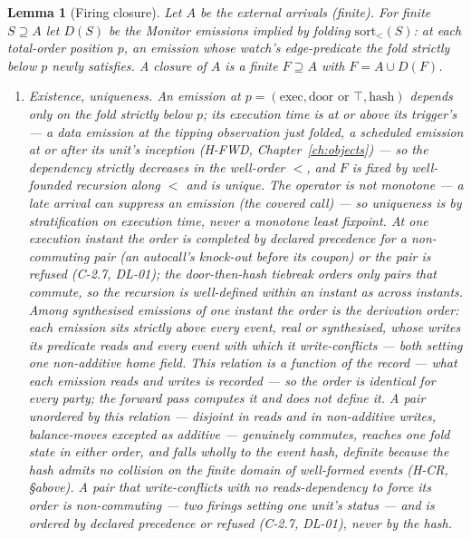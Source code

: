 \documentclass[11pt,a4paper]{article}
\newtheorem{lemma}[definition]{Lemma}
\begin{document}
\begin{lemma}[Firing closure]\label{lem:closure}
Let $A$ be the external arrivals (finite). For finite $S\supseteq A$ let $D(S)$ be the Monitor
emissions implied by folding $\mathrm{sort}_<(S)$: at each total-order position $p$, an emission
whose watch's edge-predicate the fold strictly below $p$ newly satisfies. A \emph{closure} of
$A$ is a finite $F\supseteq A$ with $F=A\cup D(F)$.
\begin{enumerate}
\item \emph{Existence, uniqueness.} An emission at $p=(\mathrm{exec},\mathrm{door}\text{ or }\top,
  \mathrm{hash})$ depends only on the fold strictly below $p$; its execution time is at or above
  its trigger's --- a data emission at the tipping observation just folded, a scheduled emission
  at or after its unit's inception \textup{(H-FWD, Chapter~\ref{ch:objects})} --- so the
  dependency strictly decreases in the well-order $<$, and $F$ is fixed by well-founded recursion
  along $<$ and is unique. The operator is \emph{not} monotone --- a late arrival can suppress an
  emission (the covered call) --- so uniqueness is by stratification on execution time, never a
  monotone least fixpoint. At one execution instant the order is completed by declared precedence
  for a non-commuting pair (an autocall's knock-out before its coupon) or the pair is refused
  (C-2.7, DL-01); the door-then-hash tiebreak orders only pairs that commute, so the recursion is
  well-defined within an instant as across instants. Among synthesised emissions of one instant the
  order is the \emph{derivation order}: each emission sits strictly above every event, real or
  synthesised, whose writes its predicate reads \emph{and} every event with which it write-conflicts
  --- both setting one non-additive home field. This relation is a function of the record --- what
  each emission reads and writes is recorded --- so the order is identical for every party; the
  forward pass \emph{computes} it and does not define it. A pair unordered by this relation ---
  disjoint in reads and in non-additive writes, balance-moves excepted as additive --- genuinely
  \emph{commutes}, reaches one fold state in either order, and falls wholly to the event hash,
  definite because the hash admits no collision on the finite domain of well-formed events (H-CR,
  \S above). A pair that write-conflicts with no reads-dependency to force its order is
  \emph{non-commuting} --- two firings setting one unit's status --- and is ordered by declared
  precedence or refused (C-2.7, DL-01), never by the hash.

\end{enumerate}
\end{lemma}
\end{document}
